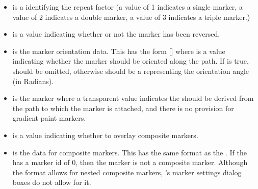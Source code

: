\begin{numbered}
\begin{enumerate}
\begin{enumerate}
\begin{itemize}
      \item {} is a  identifying the repeat factor
      (a value of 1 indicates a single marker, a value of 2 indicates
      a double marker, a value of 3 indicates a triple marker.)

      \item {} is a  value indicating whether
      or not the marker has been reversed.

      \item {} is the marker orientation data. This has
      the form  [] where 
      is a  value indicating whether the marker should be
      oriented along the path. If  is true, 
      should be omitted, otherwise  should be a 
      representing the orientation angle (in Radians).

      \item {} is the marker  where
      a transparent value indicates the  should be derived from
      the path to which the marker is attached, and there is no provision
      for gradient paint markers.

      \item {} is a  value indicating whether
      to overlay composite markers.

      \item {} is the data for composite markers.
      This has the same format as the . If the
       has a marker id of 0, then the marker
      is not a composite marker. Although the format allows for nested
      composite markers, \FlowframTk's marker settings dialog boxes do not
      allow for it.
      \end{itemize}


\end{enumerate}
\end{enumerate}
\end{numbered}
